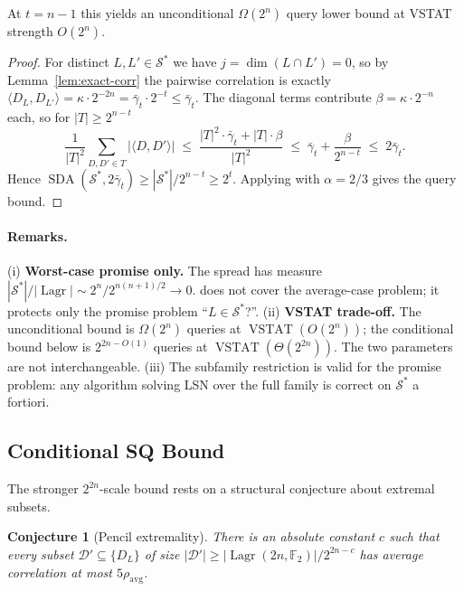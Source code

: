 \documentclass[11pt,a4paper]{article}
\theoremstyle{plain}
\newtheorem{conjecture}[theorem]{Conjecture}
\theoremstyle{definition}
\newcommand{\F}{\mathbb{F}}
\DeclareMathOperator{\Lagr}{Lagr}
\DeclareMathOperator{\SDA}{SDA}
\DeclareMathOperator{\VSTAT}{VSTAT}
\begin{document}
At $t = n-1$ this yields an unconditional $\Omega(2^n)$ query lower bound at VSTAT strength $O(2^n)$.

\begin{proof}
For distinct $L, L' \in \mathcal{S}^*$ we have $j = \dim(L \cap L') = 0$, so by Lemma~\ref{lem:exact-corr} the pairwise correlation is exactly $\langle D_L, D_{L'}\rangle = \kappa \cdot 2^{-2n} = \bar\gamma_t \cdot 2^{-t} \leq \bar\gamma_t$. The diagonal terms contribute $\beta = \kappa \cdot 2^{-n}$ each, so for $|T| \geq 2^{n-t}$
\[
\frac{1}{|T|^2}\sum_{D,D' \in T} |\langle D,D'\rangle|
\;\leq\; \frac{|T|^2 \cdot \bar\gamma_t + |T| \cdot \beta}{|T|^2}
\;\leq\; \bar\gamma_t + \frac{\beta}{2^{n-t}}
\;\leq\; 2\bar\gamma_t.
\]
Hence $\SDA(\mathcal{S}^*, 2\bar\gamma_t) \geq |\mathcal{S}^*| / 2^{n-t} \geq 2^t$. Applying  with $\alpha = 2/3$ gives the query bound.
\end{proof}

\paragraph{Remarks.}
(i) \textbf{Worst-case promise only.} The spread has measure $|\mathcal{S}^*|/|\Lagr| \sim 2^n / 2^{n(n+1)/2} \to 0$.  does not cover the average-case problem; it protects only the promise problem ``$L \in \mathcal{S}^*$?''.
(ii) \textbf{VSTAT trade-off.} The unconditional bound is $\Omega(2^n)$ queries at $\VSTAT(O(2^n))$; the conditional bound below is $2^{2n-O(1)}$ queries at $\VSTAT(\Theta(2^{2n}))$. The two parameters are not interchangeable.
(iii) The subfamily restriction is valid for the promise problem: any algorithm solving LSN over the full family is correct on $\mathcal{S}^*$ a fortiori.

\subsection{Conditional SQ Bound}
\label{subsec:main-sq}

The stronger $2^{2n}$-scale bound rests on a structural conjecture about extremal subsets.

\begin{conjecture}[Pencil extremality]
\label{conj:pencil}
There is an absolute constant $c$ such that every subset $\mathcal{D}' \subseteq \{D_L\}$ of size $|\mathcal{D}'| \geq |\Lagr(2n,\F_2)| / 2^{2n-c}$ has average correlation at most $5\rho_{\mathrm{avg}}$.
\end{conjecture}
\end{document}
